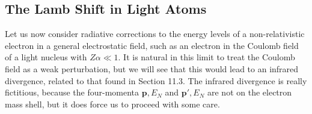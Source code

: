 
\subsection{The Lamb Shift in Light Atoms}

Let us now consider radiative corrections to the energy levels of a
non-relativistic electron in a general electrostatic field, such as an electron
in the Coulomb field of a light nucleus with $Z\alpha\ll1$. It is natural in
this limit to treat the Coulomb field as a weak perturbation, but we will see
that this would lead to an infrared divergence, related to that found in
Section 11.3. The infrared divergence is really fictitious, because the
four-momenta $\mathbf p,E_N$ and $\mathbf p',E_N$ are not on the electron mass
shell, but it does force us to proceed with some care.

